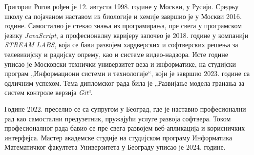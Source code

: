 \documentclass[12pt,oneside]{memoir}
\begin{document}
\begin{biografija}
Григории Рогов рођен је 12. августа 1998. године у Москви, у Русији. Средњу школу са појачаном наставом из биологије и хемије завршио је у Москви 2016. године. Самостално је стекао знања из програмирања, пре свега у програмском језику \textit{JavaScript}, а професионалну каријеру започео је 2018. године у компанији \textit{STREAM LABS}, која се бави развојем хардверских и софтверских решења за телевизијску и радијску опрему, као и системе видео-надзора. Исте године уписао је Московски технички универзитет веза и информатике, на студијски програм „Информациони системи и технологије“, који је завршио 2023. године са одличним успехом. Тема дипломског рада била је „Развијање модела гранања за систем контроле верзија \textit{Git}“.

Године 2022. преселио се са супругом у Београд, где је наставио професионални рад као самостални предузетник, пружајући услуге развоја софтвера. Током професионалног рада бавио се пре свега развојем веб-апликација и корисничких интерфејса. Мастер академске студије на студијском програму Информатика Математичког факултета Универзитета у Београду уписао је 2024. године.
\end{biografija}
\end{document}
